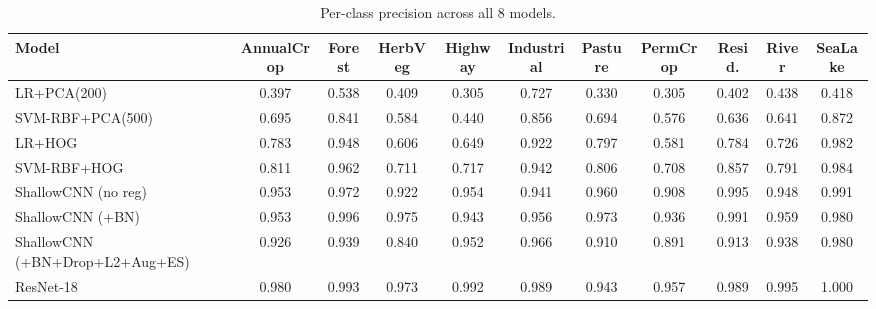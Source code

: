 \documentclass[10pt,letterpaper]{article}
\begin{document}
\begin{table}[h]
\centering
\tiny
\caption{Per-class precision across all 8 models.}
\label{tab:appB-pr}
\begin{tabular}{lcccccccccc}
\toprule
\textbf{Model} & \textbf{AnnualCrop} & \textbf{Forest} & \textbf{HerbVeg} & \textbf{Highway} & \textbf{Industrial} & \textbf{Pasture} & \textbf{PermCrop} & \textbf{Resid.} & \textbf{River} & \textbf{SeaLake} \\
\midrule
LR+PCA(200) & 0.397 & 0.538 & 0.409 & 0.305 & 0.727 & 0.330 & 0.305 & 0.402 & 0.438 & 0.418 \\
SVM-RBF+PCA(500) & 0.695 & 0.841 & 0.584 & 0.440 & 0.856 & 0.694 & 0.576 & 0.636 & 0.641 & 0.872 \\
LR+HOG & 0.783 & 0.948 & 0.606 & 0.649 & 0.922 & 0.797 & 0.581 & 0.784 & 0.726 & 0.982 \\
SVM-RBF+HOG & 0.811 & 0.962 & 0.711 & 0.717 & 0.942 & 0.806 & 0.708 & 0.857 & 0.791 & 0.984 \\
ShallowCNN (no reg) & 0.953 & 0.972 & 0.922 & 0.954 & 0.941 & 0.960 & 0.908 & 0.995 & 0.948 & 0.991 \\
ShallowCNN (+BN) & 0.953 & 0.996 & 0.975 & 0.943 & 0.956 & 0.973 & 0.936 & 0.991 & 0.959 & 0.980 \\
ShallowCNN (+BN+Drop+L2+Aug+ES) & 0.926 & 0.939 & 0.840 & 0.952 & 0.966 & 0.910 & 0.891 & 0.913 & 0.938 & 0.980 \\
ResNet-18 & 0.980 & 0.993 & 0.973 & 0.992 & 0.989 & 0.943 & 0.957 & 0.989 & 0.995 & 1.000 \\
\bottomrule
\end{tabular}
\end{table}
\end{document}

